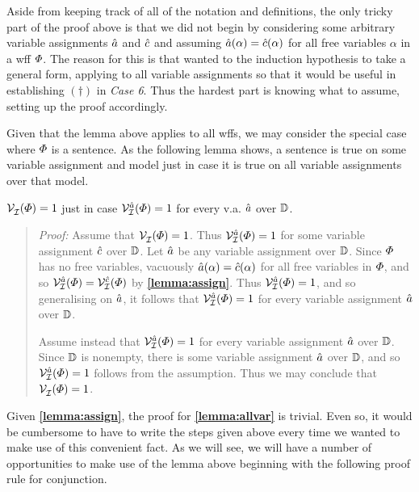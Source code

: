 Aside from keeping track of all of the notation and definitions, the only tricky part of the proof above is that we did not begin by considering some arbitrary variable assignments $\hat{a}$ and $\hat{c}$ and assuming $\hat{a}(\alpha)=\hat{c}(\alpha)$ for all free variables $\alpha$ in a wff $\varPhi$.
The reason for this is that wanted to the induction hypothesis to take a general form, applying to all variable assignments so that it would be useful in establishing $(\dagger)$ in \textit{Case 6}.
Thus the hardest part is knowing what to assume, setting up the proof accordingly.

Given that the lemma above applies to all wffs, we may consider the special case where $\varPhi$ is a sentence.
As the following lemma shows, a sentence is true on some variable assignment and model just in case it is true on all variable assignments over that model.

\begin{Lthm} \label{lemma:allvar}
  $\mathcal{V}_{\mathcal{I}}^{}(\varPhi)= 1$ just in case $\mathcal{V}_{\mathcal{I}}^{\hat{a}}(\varPhi)= 1$ for every v.a. $\hat{a}$ over $\mathbb{D}$. 
\end{Lthm}
\begin{quote} 
  \textit{Proof:} 
       Assume that $\mathcal{V}_{\mathcal{I}}^{}(\varPhi)= 1$.
       Thus $\mathcal{V}_{\mathcal{I}}^{\hat{a}}(\varPhi)= 1$ for some variable assignment $\hat{c}$ over $\mathbb{D}$.
       Let $\hat{a}$ be any variable assignment over $\mathbb{D}$.
       Since $\varPhi$ has no free variables, vacuously $\hat{a}(\alpha)=\hat{c}(\alpha)$ for all free variables in $\varPhi$, and so $\mathcal{V}_{\mathcal{I}}^{\hat{a}}(\varPhi)=\mathcal{V}_{\mathcal{I}}^{\hat{c}}(\varPhi)$ by \textbf{\ref{lemma:assign}}.
       Thus $\mathcal{V}_{\mathcal{I}}^{\hat{a}}(\varPhi)=1$, and so generalising on $\hat{a}$, it follows that $\mathcal{V}_{\mathcal{I}}^{\hat{a}}(\varPhi)= 1$ for every variable assignment $\hat{a}$ over $\mathbb{D}$.  

       Assume instead that $\mathcal{V}_{\mathcal{I}}^{\hat{a}}(\varPhi)=1$ for every variable assignment $\hat{a}$ over $\mathbb{D}$.
       Since $\mathbb{D}$ is nonempty, there is some variable assignment $\hat{a}$ over $\mathbb{D}$, and so $\mathcal{V}_{\mathcal{I}}^{\hat{a}}(\varPhi)=1$ follows from the assumption. 
       Thus we may conclude that $\mathcal{V}_{\mathcal{I}}^{}(\varPhi)=1$.
\end{quote}




Given \textbf{\ref{lemma:assign}}, the proof for \textbf{\ref{lemma:allvar}} is trivial.
Even so, it would be cumbersome to have to write the steps given above every time we wanted to make use of this convenient fact.
As we will see, we will have a number of opportunities to make use of the lemma above beginning with the following proof rule for conjunction.

